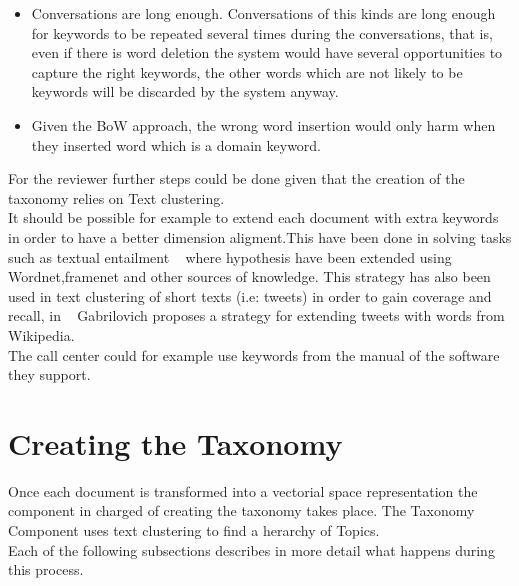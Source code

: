 \documentclass[4pt,a4paper,twocolumn]{article}
\begin{document}
\begin{itemize}
	\item Conversations are long enough. Conversations of this kinds are long enough for keywords to be repeated several times during the conversations, that is, even if there is word deletion the system would have several opportunities to capture the right keywords, the other words which are not likely to be keywords will be discarded by the system anyway.

  \item Given the BoW approach, the wrong word insertion would only harm when they inserted word which is a domain keyword.
  
\end{itemize}

For the reviewer further steps could be done given that the creation of the taxonomy relies on Text clustering.\\
It should be possible for example to extend each document with extra keywords in order to have a better dimension aligment.This have been done in solving tasks such as  textual entailment ~\cite{Mirkin:2009:EIU:1609067.1609129} where hypothesis have been extended using Wordnet,framenet and other sources of knowledge. This strategy has also been used in text clustering of short texts (i.e: tweets)  in order to gain coverage and recall, in ~\cite{Gabrilovich:2006:OBB:1597348.1597395} Gabrilovich proposes a strategy for extending tweets with words from Wikipedia.\\
The call center could for example use keywords from the manual of the software they support.


\section{Creating the Taxonomy}

Once each document is transformed into a vectorial space representation the component in charged of creating the taxonomy takes place. The Taxonomy Component uses text clustering to find a herarchy of Topics.\\
Each of the following subsections describes in more detail what happens during this process.
\end{document}
